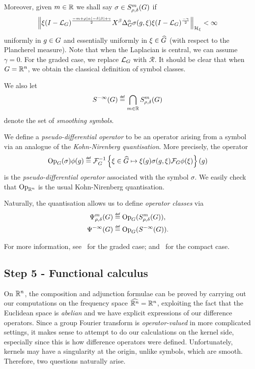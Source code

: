 Moreover,
given $m \in \R$
we shall say $\sigma \in \SymbolClass m {\rho, \delta}$ if
\begin{align*}
    \norm [\mathcal H_\xi] {%
        \xi \BesselPotential {-m + \rho \abs \alpha - \delta \abs \beta + \gamma}
        \LeftDifferentialOperator \beta \DifferenceOperatorOrder \alpha \sigma(g, \xi)
        \xi \BesselPotential {-\gamma}
    }
    < \infty
\end{align*}
uniformly in $g \in \Group$
and essentially uniformly in $\xi \in \dualGroup \Group$ (with respect to the Plancherel measure).
Note that when the Laplacian is central,
we can assume $\gamma = 0$.
For the graded case,
we replace $\Laplacian$ with $\mathcal R$.
It should be clear that when $\Group = \R^n$,
we obtain the classical definition of symbol classes.

We also let
\begin{align*}
    \SmoothingSymbols \defeq \bigcap_{m \in \R} \SymbolClass m {\rho, \delta}
\end{align*}
denote the set of \emph{smoothing symbols}.

We define a \emph{pseudo-differential operator} to be an operator arising from a symbol via an analogue of the \emph{Kohn-Nirenberg quantisation}.
More precisely,
the operator
\begin{align*}
    \Op(\sigma) \phi(g)
    \defeq \InverseFourier \left\{ \xi \in \dualGroup \Group \mapsto \xi(g) \sigma(g, \xi) \Fourier \phi(\xi)\right\}(g)
\end{align*}
is the \emph{pseudo-differential operator} associated with the symbol $\sigma$.
We easily check that $\Op [\R^n]$ is the usual Kohn-Nirenberg quantisation.

Naturally,
the quantisation allows us to define \emph{operator classes} via
\begin{align*}
    \OperatorClass m {\rho, \delta} &\defeq \Op(\SymbolClass m {\rho, \delta}),\\
    \SmoothingOperators &\defeq \Op(\SmoothingSymbols).
\end{align*}

For more information,
see~\cite[Section 5.1]{FischerRuzhansky16} for the graded case;
and~\cite[Section 3.1]{Fischer2015} for the compact case.

\subsection*{Step 5 - Functional calculus}

On $\R^n$,
the composition and adjunction formulae can be proved by carrying out our computations on the frequency space $\dualGroup {\R^n} = \R^n$,
exploiting the fact that the Euclidean space is \emph{abelian} and we have explicit expressions of our difference operators.
Since a group Fourier transform is \emph{operator-valued} in more complicated settings,
it makes sense to attempt to do our calculations on the kernel side,
especially since this is how difference operators were defined.
Unfortunately,
kernels may have a singularity at the origin,
unlike symbols, which are smooth.
Therefore, two questions naturally arise.

